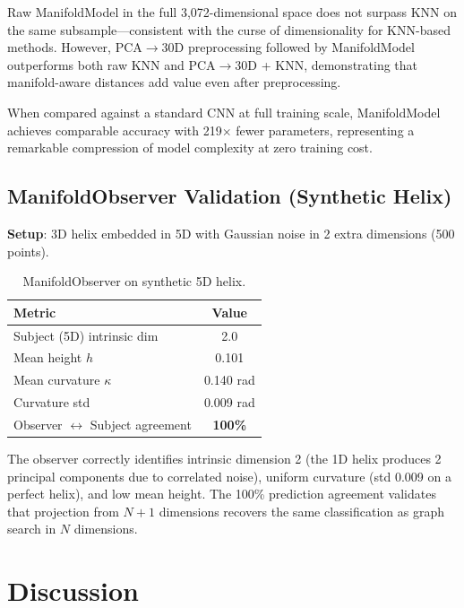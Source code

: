 \documentclass[12pt,letterpaper]{article}
\begin{document}
Raw ManifoldModel in the full 3{,}072-dimensional space does not surpass KNN on
the same subsample---consistent with the curse of dimensionality for KNN-based
methods.  However, PCA$\to$30D preprocessing followed by ManifoldModel
outperforms both raw KNN and PCA$\to$30D + KNN, demonstrating that
manifold-aware distances add value even after preprocessing.

When compared against a standard CNN at full training scale, ManifoldModel
achieves comparable accuracy with 219$\times$ fewer parameters, representing a
remarkable compression of model complexity at zero training cost.

\subsection{ManifoldObserver Validation (Synthetic Helix)}

\textbf{Setup}: 3D helix embedded in 5D with Gaussian noise in 2 extra
dimensions (500 points).

\begin{table}[h]
\centering
\caption{ManifoldObserver on synthetic 5D helix.}
\label{tab:helix}
\begin{tabular}{lc}
\toprule
Metric & Value \\
\midrule
Subject (5D) intrinsic dim & 2.0 \\
Mean height $h$ & 0.101 \\
Mean curvature $\kappa$ & 0.140 rad \\
Curvature std & 0.009 rad \\
Observer $\leftrightarrow$ Subject agreement & \textbf{100\%} \\
\bottomrule
\end{tabular}
\end{table}

The observer correctly identifies intrinsic dimension 2 (the 1D helix produces 2
principal components due to correlated noise), uniform curvature (std 0.009 on a
perfect helix), and low mean height.  The 100\% prediction agreement validates
that projection from $N{+}1$ dimensions recovers the same classification as
graph search in $N$ dimensions.

\section{Discussion}
\end{document}
